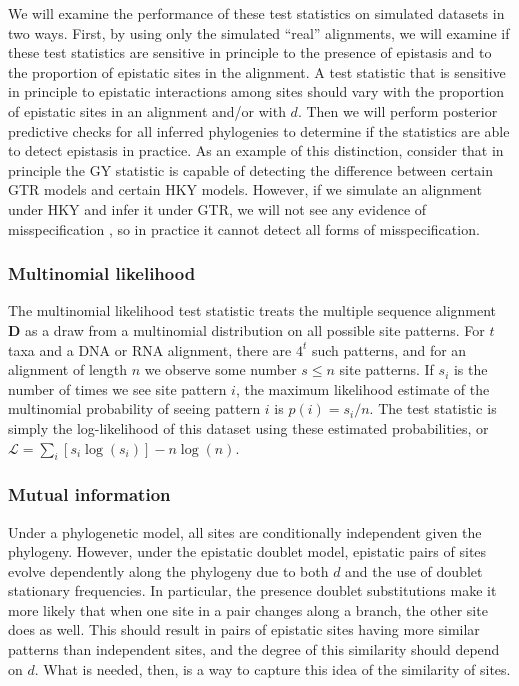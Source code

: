 \documentclass[11pt]{article}
\begin{document}
We will examine the performance of these test statistics on simulated datasets in two ways.
First, by using only the simulated ``real'' alignments, we will examine if these test statistics are sensitive in principle to the presence of epistasis and to the proportion of epistatic sites in the alignment.
A test statistic that is sensitive in principle to epistatic interactions among sites should vary with the proportion of epistatic sites in an alignment and/or with $d$.
Then we will perform posterior predictive checks for all inferred phylogenies to determine if the statistics are able to detect epistasis in practice.
As an example of this distinction, consider that in principle the GY statistic is capable of detecting the difference between certain GTR \citep{tavare1986some} models and certain HKY \citep{hasegawa1985dating} models.
However, if we simulate an alignment under HKY and infer it under GTR, we will not see any evidence of misspecification \citep{bollback2002bayesian}, so in practice it cannot detect all forms of misspecification.

\subsubsection*{Multinomial likelihood\label{sec:goldman}}

The multinomial likelihood test statistic treats the multiple sequence alignment $\boldsymbol{D}$ as a draw from a multinomial distribution on all possible site patterns.
For $t$ taxa and a DNA or RNA alignment, there are $4^t$ such patterns, and for an alignment of length $n$ we observe some number $s \leq n$ site patterns.
If $s_i$ is the number of times we see site pattern $i$, the maximum likelihood estimate of the multinomial probability of seeing pattern $i$ is $p(i) = s_i / n$.
The test statistic is simply the log-likelihood of this dataset using these estimated probabilities, or $\mathcal{L} = \sum_i [ s_i \log(s_i)]  - n \log(n)$.

\subsubsection*{Mutual information\label{sec:mi}}

Under a phylogenetic model, all sites are conditionally independent given the phylogeny.
However, under the epistatic doublet model, epistatic pairs of sites evolve dependently along the phylogeny due to both $d$ and the use of doublet stationary frequencies.
In particular, the presence doublet substitutions make it more likely that when one site in a pair changes along a branch, the other site does as well.
This should result in pairs of epistatic sites having more similar patterns than independent sites, and the degree of this similarity should depend on $d$.
What is needed, then, is a way to capture this idea of the similarity of sites.
\end{document}
